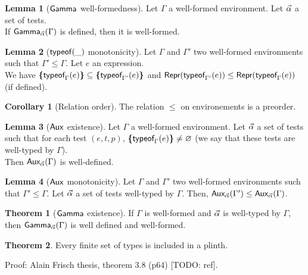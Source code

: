 \documentclass[a4paper]{article}
\theoremstyle{definition}
\newtheorem{theorem}{Theorem}
\newtheorem{lemma}{Lemma}
\newtheorem{corollary}{Corollary}
\begin{document}
        \begin{lemma}[$\textsf{Gamma}_{} $ well-formedness]
          Let $\Gamma$ a well-formed environment. Let $\vec \alpha$ a set of tests.\\
          If $\textsf{Gamma}_{\vec \alpha}(\Gamma)$ is defined, then it is well-formed.
        \end{lemma}

        \begin{lemma}[$\textsf{typeof}_{}(\_)$ monotonicity]
          Let $\Gamma$ and $\Gamma'$ two well-formed environments such that $\Gamma' \leq \Gamma$.
          Let $e$ an expression.\\
          We have $\textbf{\textup{\{}}\textsf{typeof}_{\Gamma}(e)\textbf{\textup{\}}} \subseteq \textbf{\textup{\{}}\textsf{typeof}_{\Gamma'}(e)\textbf{\textup{\}}}$ and
          $\textsf{Repr}(\textsf{typeof}_{\Gamma'}(e)) \leq \textsf{Repr}(\textsf{typeof}_{\Gamma}(e))$ (if defined).
        \end{lemma}

        \begin{corollary}[Relation order]
          The relation $\leq$ on environements is a preorder.
        \end{corollary}

        \begin{lemma}[$\textsf{Aux}_{} $ existence]
          Let $\Gamma$ a well-formed environment.
          Let $\vec \alpha$ a set of tests such that for each test $(e,t,p)$, $\textbf{\textup{\{}}\textsf{typeof}_{\Gamma}(e)\textbf{\textup{\}}} \neq \varnothing$
          (we say that these tests are well-typed by $\Gamma$).\\
          Then $\textsf{Aux}_{\vec \alpha}(\Gamma)$ is well-defined.
        \end{lemma}

        \begin{lemma}[$\textsf{Aux}_{}$ monotonicity]
          Let $\Gamma$ and $\Gamma'$ two well-formed environments such that $\Gamma' \leq \Gamma$.
          Let $\vec \alpha$ a set of tests well-typed by $\Gamma$. Then, $\textsf{Aux}_{\vec \alpha}(\Gamma') \leq \textsf{Aux}_{\vec \alpha}(\Gamma)$.
        \end{lemma}

        \begin{theorem}[$\textsf{Gamma}_{}$ existence]
            If $\Gamma$ is well-formed and $\vec \alpha$ is well-typed by $\Gamma$, then $\textsf{Gamma}_{\vec \alpha}(\Gamma)$ is well defined and well-formed.
        \end{theorem}

        \begin{theorem}
          Every finite set of types is included in a plinth.
        \end{theorem}
        Proof: Alain Frisch thesis, theorem 3.8 (p64) [TODO: ref].
\end{document}
